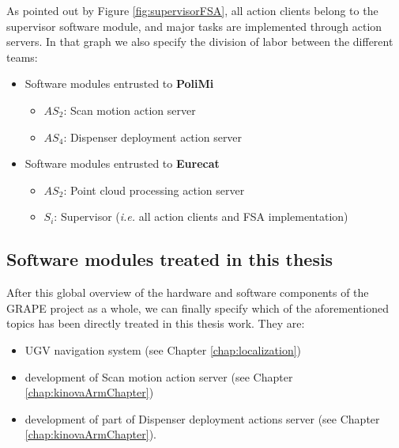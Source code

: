 

As pointed out by Figure \ref{fig:supervisorFSA}, all action clients belong to the supervisor software module, and major tasks are implemented through action servers. In that graph we also specify the division of labor between the different teams:

\begin{itemize}
	\item Software modules entrusted to \textbf{PoliMi}
		\begin{itemize}
			\item $AS_2$: Scan motion action server
			\item $AS_4$:	 Dispenser deployment action server
		\end{itemize}
	\item Software modules entrusted to \textbf{Eurecat}
		\begin{itemize}
			\item $AS_2$: Point cloud processing action server
			\item $S_i$:	 Supervisor (\textit{i.e.} all action clients and \ac{FSA} implementation)
		\end{itemize}		
\end{itemize}

\subsection{Software modules treated in this thesis}

After this global overview of the hardware and software components of the \ac{GRAPE} project as a whole, we can finally specify which of the aforementioned topics has been directly treated in this thesis work. They are:
\begin{itemize}
	\item \ac{UGV} navigation system (see Chapter \ref{chap:localization})
	\item development of Scan motion action server (see Chapter \ref{chap:kinovaArmChapter})
	\item development of part of Dispenser deployment actions server (see Chapter \ref{chap:kinovaArmChapter}).
\end{itemize}
